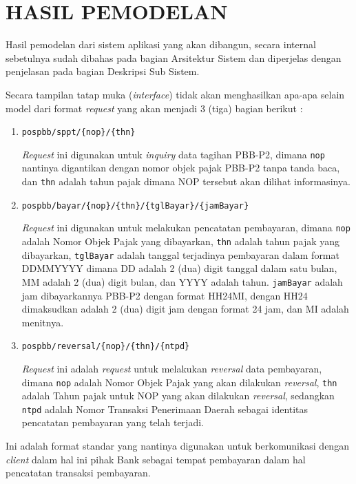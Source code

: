 \chapter{HASIL PEMODELAN}

Hasil pemodelan dari sistem aplikasi yang akan dibangun, secara internal sebetulnya sudah dibahas pada bagian Arsitektur Sistem dan diperjelas dengan penjelasan pada bagian Deskripsi Sub Sistem. 

Secara tampilan tatap muka (\textit{interface}) tidak akan menghasilkan apa-apa selain model dari format \textit{request} yang akan menjadi 3 (tiga) bagian berikut :

\begin{enumerate}
  \item \texttt{pospbb/sppt/\{nop\}/\{thn\}}
  
  \textit{Request} ini digunakan untuk \textit{inquiry} data tagihan PBB-P2, dimana \texttt{nop} nantinya digantikan dengan nomor objek pajak PBB-P2 tanpa tanda baca, dan \texttt{thn} adalah tahun pajak dimana NOP tersebut akan dilihat informasinya.
  
  \item \texttt{pospbb/bayar/\{nop\}/\{thn\}/\{tglBayar\}/\{jamBayar\}}
  
  \textit{Request} ini digunakan untuk melakukan pencatatan pembayaran, dimana \texttt{nop} adalah Nomor Objek Pajak yang dibayarkan, \texttt{thn} adalah tahun pajak yang dibayarkan, \texttt{tglBayar} adalah tanggal terjadinya pembayaran dalam format DDMMYYYY dimana DD adalah 2 (dua) digit tanggal dalam satu bulan, MM adalah 2 (dua) digit bulan, dan YYYY adalah tahun. \texttt{jamBayar} adalah jam dibayarkannya PBB-P2 dengan format HH24MI, dengan HH24 dimaksudkan adalah 2 (dua) digit jam dengan format 24 jam, dan MI adalah menitnya.
  
  \item \texttt{pospbb/reversal/\{nop\}/\{thn\}/\{ntpd\}}
  
  \textit{Request} ini adalah \textit{request} untuk melakukan \textit{reversal} data pembayaran, dimana \texttt{nop} adalah Nomor Objek Pajak yang akan dilakukan \textit{reversal}, \texttt{thn} adalah Tahun pajak untuk NOP yang akan dilakukan \textit{reversal}, sedangkan \texttt{ntpd} adalah Nomor Transaksi Penerimaan Daerah sebagai identitas pencatatan pembayaran yang telah terjadi.
  
\end{enumerate}

Ini adalah format standar yang nantinya digunakan untuk berkomunikasi dengan \textit{client} dalam hal ini pihak Bank sebagai tempat pembayaran dalam hal pencatatan transaksi pembayaran.